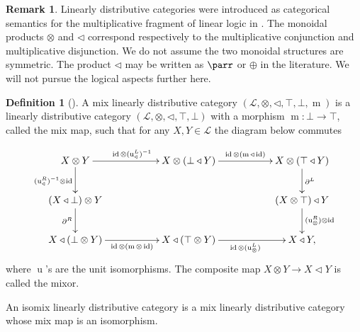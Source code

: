 \documentclass{article}
\numberwithin{equation}{section}
\theoremstyle{definition}
\newtheorem{definition}[thm]{Definition}
\newtheorem{rem}[thm]{Remark}
\begin{document}
\begin{rem}
Linearly distributive categories were introduced as categorical semantics for the multiplicative fragment of linear logic in \cite{CS}. 
The monoidal products $\otimes$ and $\triangleleft$ correspond respectively to the multiplicative conjunction and multiplicative disjunction.
We do not assume the two monoidal structures are symmetric.
The product $\triangleleft$ may be written as $\parr$ or $\oplus$ in the literature.
We will not pursue the logical aspects further here.
\end{rem}



\begin{definition}[\cite{SS}]A mix linearly distributive category $(\mathcal{L}, \otimes, \triangleleft, \top, \bot, \operatorname{m})$ is a linearly distributive category $(\mathcal{L}, \otimes, \triangleleft, \top, \bot)$ with a morphism $\operatorname{m}:\bot\to\top$, called the mix map, such that for any $X, Y\in\mathcal{L}$ the diagram below commutes

\[
\xymatrix{
  X\otimes Y \ar[rr]^{\operatorname{id}\otimes (\operatorname{u}_{\triangleleft}^{L})^{-1}}\ar[d]_{(\operatorname{u}_{\triangleleft}^{R})^{-1}\otimes\operatorname{id}}&&X\otimes(\bot\triangleleft Y)\ar[rr]^{\operatorname{id}\otimes (\operatorname{m}\triangleleft\operatorname{id})}&&X\otimes(\top\triangleleft Y) \ar[d]^{\partial^{L}}\\
  (X\triangleleft\bot)\otimes Y \ar[d]_{\partial^{R}}&&&& (X\otimes\top)\triangleleft Y\ar[d]^{(\operatorname{u}_{\otimes}^{R})\otimes\operatorname{id}}\\
   X\triangleleft(\bot\otimes Y)\ar[rr]_{\operatorname{id}\otimes (\operatorname{m}\otimes\operatorname{id})}&& X\triangleleft(\top\otimes Y)\ar[rr]_{\operatorname{id}\otimes (\operatorname{u}_{\otimes}^{L})}& &X\triangleleft Y,
}\]
where $\operatorname{u}$'s are the unit isomorphisms.
The composite map $X\otimes Y\to X\triangleleft Y$ is called the mixor.

An isomix linearly distributive category is a mix linearly distributive category whose mix map is an isomorphism.

\end{definition}
\end{document}
